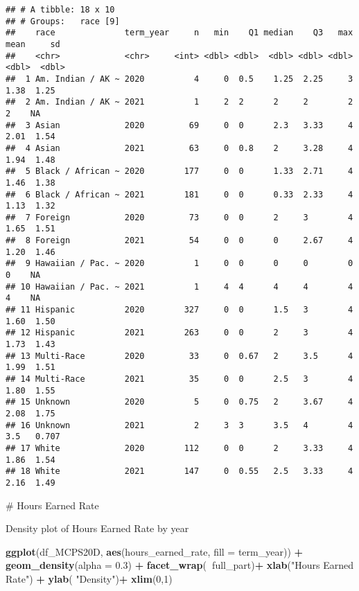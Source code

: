 \documentclass[]{article}
\newenvironment{Shaded}{\begin{snugshade}}{\end{snugshade}}
\newcommand{\DataTypeTok}[1]{\textcolor[rgb]{0.13,0.29,0.53}{#1}}
\newcommand{\DecValTok}[1]{\textcolor[rgb]{0.00,0.00,0.81}{#1}}
\newcommand{\FloatTok}[1]{\textcolor[rgb]{0.00,0.00,0.81}{#1}}
\newcommand{\KeywordTok}[1]{\textcolor[rgb]{0.13,0.29,0.53}{\textbf{#1}}}
\newcommand{\NormalTok}[1]{#1}
\newcommand{\OperatorTok}[1]{\textcolor[rgb]{0.81,0.36,0.00}{\textbf{#1}}}
\newcommand{\StringTok}[1]{\textcolor[rgb]{0.31,0.60,0.02}{#1}}
\begin{document}
\begin{verbatim}
## # A tibble: 18 x 10
## # Groups:   race [9]
##    race              term_year     n   min    Q1 median    Q3   max  mean     sd
##    <chr>             <chr>     <int> <dbl> <dbl>  <dbl> <dbl> <dbl> <dbl>  <dbl>
##  1 Am. Indian / AK ~ 2020          4     0  0.5    1.25  2.25     3  1.38  1.25 
##  2 Am. Indian / AK ~ 2021          1     2  2      2     2        2  2    NA    
##  3 Asian             2020         69     0  0      2.3   3.33     4  2.01  1.54 
##  4 Asian             2021         63     0  0.8    2     3.28     4  1.94  1.48 
##  5 Black / African ~ 2020        177     0  0      1.33  2.71     4  1.46  1.38 
##  6 Black / African ~ 2021        181     0  0      0.33  2.33     4  1.13  1.32 
##  7 Foreign           2020         73     0  0      2     3        4  1.65  1.51 
##  8 Foreign           2021         54     0  0      0     2.67     4  1.20  1.46 
##  9 Hawaiian / Pac. ~ 2020          1     0  0      0     0        0  0    NA    
## 10 Hawaiian / Pac. ~ 2021          1     4  4      4     4        4  4    NA    
## 11 Hispanic          2020        327     0  0      1.5   3        4  1.60  1.50 
## 12 Hispanic          2021        263     0  0      2     3        4  1.73  1.43 
## 13 Multi-Race        2020         33     0  0.67   2     3.5      4  1.99  1.51 
## 14 Multi-Race        2021         35     0  0      2.5   3        4  1.80  1.55 
## 15 Unknown           2020          5     0  0.75   2     3.67     4  2.08  1.75 
## 16 Unknown           2021          2     3  3      3.5   4        4  3.5   0.707
## 17 White             2020        112     0  0      2     3.33     4  1.86  1.54 
## 18 White             2021        147     0  0.55   2.5   3.33     4  2.16  1.49
\end{verbatim}

\# Hours Earned Rate

Density plot of Hours Earned Rate by year

\begin{Shaded}
\begin{Highlighting}[]
\KeywordTok{ggplot}\NormalTok{(df_MCPS20D, }\KeywordTok{aes}\NormalTok{(hours_earned_rate, }\DataTypeTok{fill =}\NormalTok{ term_year)) }\OperatorTok{+}\StringTok{ }\KeywordTok{geom_density}\NormalTok{(}\DataTypeTok{alpha =} \FloatTok{0.3}\NormalTok{) }\OperatorTok{+}
\StringTok{  }\KeywordTok{facet_wrap}\NormalTok{(}\OperatorTok{~}\NormalTok{full_part)}\OperatorTok{+}
\StringTok{  }\KeywordTok{xlab}\NormalTok{(}\StringTok{"Hours Earned Rate"}\NormalTok{) }\OperatorTok{+}
\StringTok{  }\KeywordTok{ylab}\NormalTok{( }\StringTok{"Density"}\NormalTok{)}\OperatorTok{+}
\StringTok{  }\KeywordTok{xlim}\NormalTok{(}\DecValTok{0}\NormalTok{,}\DecValTok{1}\NormalTok{)}
\end{Highlighting}
\end{Shaded}
\end{document}
